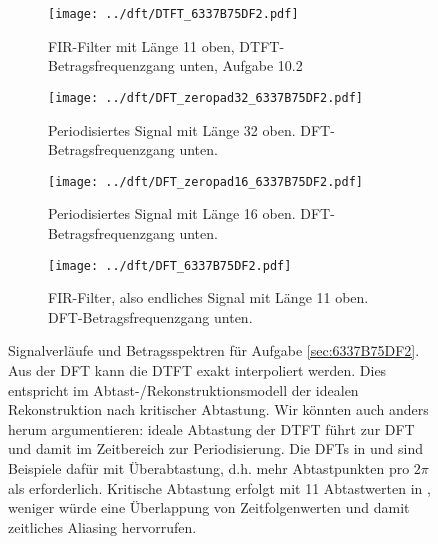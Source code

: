 \begin{figure*}[h!]
\centering
\begin{subfigure}{0.495\textwidth}
\texttt{[image: ../dft/DTFT\_6337B75DF2.pdf]}
\caption{FIR-Filter mit Länge 11 oben, DTFT-Betragsfrequenzgang unten,
Aufgabe 10.2}
\label{fig:DTFT_6337B75DF2}
\end{subfigure}
\begin{subfigure}{0.495\textwidth}
\texttt{[image: ../dft/DFT\_zeropad32\_6337B75DF2.pdf]}
\caption{Periodisiertes Signal mit Länge 32 oben. DFT-Betragsfrequenzgang unten.}
\label{fig:DFT_zeropad32_6337B75DF2}
\end{subfigure}

\begin{subfigure}{0.495\textwidth}
\texttt{[image: ../dft/DFT\_zeropad16\_6337B75DF2.pdf]}
\caption{Periodisiertes Signal mit Länge 16 oben. DFT-Betragsfrequenzgang unten.}
\label{fig:DFT_zeropad16_6337B75DF2}
\end{subfigure}
\begin{subfigure}{0.495\textwidth}
\texttt{[image: ../dft/DFT\_6337B75DF2.pdf]}
\caption{FIR-Filter, also endliches Signal mit Länge 11 oben.
DFT-Betragsfrequenzgang unten.}
\label{fig:DFT_6337B75DF2}
\end{subfigure}
\caption{Signalverläufe und Betragsspektren für Aufgabe \ref{sec:6337B75DF2}.
Aus der DFT  kann die DTFT 
exakt interpoliert werden. Dies entspricht im Abtast-/Rekonstruktionsmodell
der idealen Rekonstruktion nach kritischer Abtastung.
%
Wir könnten auch anders herum argumentieren: ideale
Abtastung der DTFT führt zur DFT und damit im Zeitbereich zur Periodisierung.
Die DFTs in  und
 sind Beispiele dafür mit Überabtastung, d.h.
mehr Abtastpunkten pro $2\pi$ als erforderlich. Kritische Abtastung erfolgt mit
11 Abtastwerten in , weniger würde eine Überlappung
von Zeitfolgenwerten und damit zeitliches Aliasing hervorrufen.
}
\label{fig:6337B75DF2}
\end{figure*}









\clearpage
